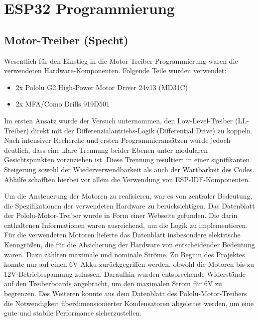 \chapter{ESP32 Programmierung}

\section{Motor-Treiber (Specht)}

Wesentlich für den Einstieg in die Motor-Treiber-Programmierung waren die verwendeten Hardware-Komponenten. Folgende Teile wurden verwendet:

\begin{itemize}
    \item 2x Pololu G2 High-Power Motor Driver 24v13 (MD31C)
    \item 2x MFA/Como Drills 919D501
\end{itemize}

Im ersten Ansatz wurde der Versuch unternommen, den Low-Level-Treiber (LL-Treiber) direkt mit der Differenzialantriebs-Logik (Differential Drive) zu koppeln. Nach intensiver Recherche und ersten Programmieransätzen wurde jedoch deutlich, dass eine klare Trennung beider Ebenen unter modularen Gesichtspunkten vorzuziehen ist. Diese Trennung resultiert in einer signifikanten Steigerung sowohl der Wiederverwendbarkeit als auch der Wartbarkeit des Codes. Abhilfe schafften hierbei vor allem die Verwendung von ESP-IDF-Komponenten.\newline

Um die Ansteuerung der Motoren zu realisieren, war es von zentraler Bedeutung, die Spezifikationen der verwendeten Hardware zu berücksichtigen. Das Datenblatt der Pololu-Motor-Treiber wurde in Form einer Webseite gefunden. Die darin enthaltenen Informationen waren ausreichend, um die Logik zu implementieren. Für die verwendeten Motoren lieferte das Datenblatt insbesondere elektrische Kenngrößen, die für die Absicherung der Hardware von entscheidender Bedeutung waren. Dazu zählten maximale und nominale Ströme. Zu Beginn des Projektes konnte nur auf einen 6V-Akku zurückgegriffen werden, obwohl die Motoren bis zu 12V-Betriebsspannung zulassen. Daraufhin wurden entsprechende Widerstände auf den Treiberboards angebracht, um den maximalen Strom für 6V zu begrenzen. Des Weiteren konnte aus dem Datenblatt des Pololu-Motor-Treibers die Notwendigkeit überdimensionierter Kondensatoren abgeleitet werden, um eine gute und stabile Performance sicherzustellen. \newline

